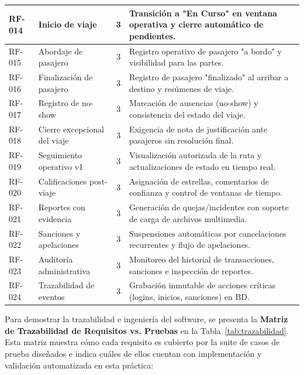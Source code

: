 \documentclass{article}
\begin{document}
\begin{longtable}{|P{1.6cm}|P{4.2cm}|c|P{7.2cm}|}
\hline
RF-014 & Inicio de viaje & 3 & Transición a "En Curso" en ventana operativa y cierre automático de pendientes. \\
\hline
RF-015 & Abordaje de pasajero & 3 & Registro operativo de pasajero "a bordo" y visibilidad para las partes. \\
\hline
RF-016 & Finalización de pasajero & 3 & Registro de pasajero "finalizado" al arribar a destino y resúmenes de viaje. \\
\hline
RF-017 & Registro de no-show & 3 & Marcación de ausencias (no-show) y consistencia del estado del viaje. \\
\hline
RF-018 & Cierre excepcional del viaje & 3 & Exigencia de nota de justificación ante pasajeros sin resolución final. \\
\hline
RF-019 & Seguimiento operativo v1 & 3 & Visualización autorizada de la ruta y actualizaciones de estado en tiempo real. \\
\hline
RF-020 & Calificaciones post-viaje & 3 & Asignación de estrellas, comentarios de confianza y control de ventanas de tiempo. \\
\hline
RF-021 & Reportes con evidencia & 3 & Generación de quejas/incidentes con soporte de carga de archivos multimedia. \\
\hline
RF-022 & Sanciones y apelaciones & 3 & Suspensiones automáticas por cancelaciones recurrentes y flujo de apelaciones. \\
\hline
RF-023 & Auditoría administrativa & 3 & Monitoreo del historial de transacciones, sanciones e inspección de reportes. \\
\hline
RF-024 & Trazabilidad de eventos & 3 & Grabación inmutable de acciones críticas (logins, inicios, sanciones) en BD. \\
\hline
\end{longtable}

Para demostrar la trazabilidad e ingeniería del software, se presenta la \textbf{Matriz de Trazabilidad de Requisitos vs. Pruebas} en la Tabla~\ref{tab:trazabilidad}. Esta matriz muestra cómo cada requisito es cubierto por la suite de casos de prueba diseñados e indica cuáles de ellos cuentan con implementación y validación automatizada en esta práctica:
\end{document}
